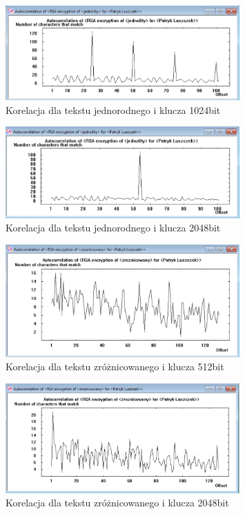 \documentclass{article}
\begin{document}
\begin{figure}[H]
    \centering
    \includegraphics[width=0.8\textwidth]{korelacja_jednorodny_1024.png}
    \caption{Korelacja dla tekstu jednorodnego i klucza 1024bit}
\end{figure}



\begin{figure}[H]
    \centering
    \includegraphics[width=0.8\textwidth]{korelacja_jednorodny_2048.png}
    \caption{Korelacja dla tekstu jednorodnego i klucza 2048bit}
\end{figure}


\begin{figure}[H]
    \centering
    \includegraphics[width=0.8\textwidth]{korelacja_zroznicowany_512.png}
    \caption{Korelacja dla tekstu zróżnicowanego i klucza 512bit}
\end{figure}

\begin{figure}[H]
    \centering
    \includegraphics[width=0.8\textwidth]{korelacja_zroznicowany_2048.png}
    \caption{Korelacja dla tekstu zróżnicowanego i klucza 2048bit}
\end{figure}
\end{document}
